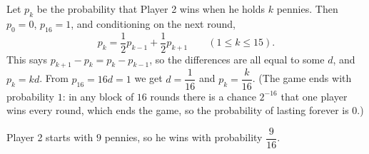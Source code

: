 Let $p_k$ be the probability that Player 2 wins when he holds $k$ pennies. Then $p_0=0$, $p_{16}=1$, and conditioning on the next round,
\[
p_k=\dfrac{1}{2}p_{k-1}+\dfrac{1}{2}p_{k+1}\qquad(1\le k\le15).
\]
This says $p_{k+1}-p_k=p_k-p_{k-1}$, so the differences are all equal to some $d$, and $p_k=kd$. From $p_{16}=16d=1$ we get $d=\dfrac{1}{16}$ and $p_k=\dfrac{k}{16}$. (The game ends with probability $1$: in any block of $16$ rounds there is a chance $2^{-16}$ that one player wins every round, which ends the game, so the probability of lasting forever is $0$.)

Player 2 starts with $9$ pennies, so he wins with probability $\boxed{\dfrac{9}{16}}$.
